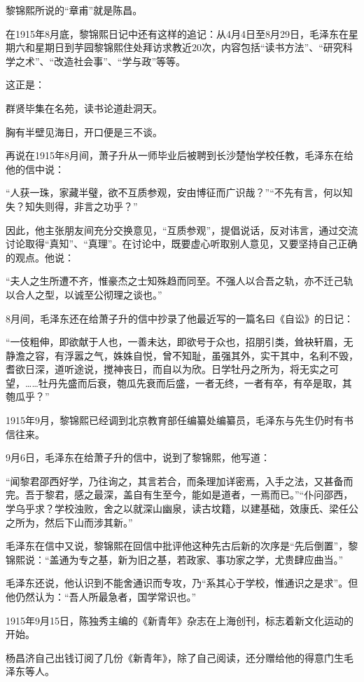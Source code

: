 \documentclass[../../dazhuan.tex]{subfiles}
\begin{document}
黎锦熙所说的“章甫”就是陈昌。

在1915年8月底，黎锦熙日记中还有这样的追记：从4月4日至8月29日，毛泽东在星期六和星期日到芋园黎锦熙住处拜访求教近20次，内容包括“读书方法”、“研究科学之术”、“改造社会事”、“学与政”等等。

这正是：\begin{xemph}群贤毕集在名苑，读书论道赴洞天。\end{xemph}


胸有半壁见海日，开口便是三不谈。

再说在1915年8月间，萧子升从一师毕业后被聘到长沙楚怡学校任教，毛泽东在给他的信中说：

“人获一珠，家藏半璧，欲不互质参观，安由博征而广识哉？”“不先有言，何以知失？知失则得，非言之功乎？”

因此，他主张朋友间充分交换意见，“互质参观”，提倡说话，反对讳言，通过交流讨论取得“真知”、“真理”。在讨论中，既要虚心听取别人意见，又要坚持自己正确的观点。他说：

“夫人之生所遭不齐，惟豪杰之士知殊趋而同至。不强人以合吾之轨，亦不迁己轨以合人之型，以诚至公彻理之谈也。”

8月间，毛泽东还在给萧子升的信中抄录了他最近写的一篇名曰《自讼》的日记：

“一伎粗伸，即欲献于人也，一善未达，即欲号于众也，招朋引类，耸袂轩眉，无静澹之容，有浮嚣之气，姝姝自悦，曾不知耻，虽强其外，实干其中，名利不毁，耆欲日深，道听途说，搅神丧日，而自以为欣。日学牡丹之所为，将无实之可望，……牡丹先盛而后衰，匏瓜先衰而后盛，一者无终，一者有卒，有卒是取，其匏瓜乎？”

1915年9月，黎锦熙已经调到北京教育部任编纂处编纂员，毛泽东与先生仍时有书信往来。

9月6日，毛泽东在给萧子升的信中，说到了黎锦熙，他写道：

“闻黎君邵西好学，乃往询之，其言若合，而条理加详密焉，入手之法，又甚备而完。吾于黎君，感之最深，盖自有生至今，能如是道者，一焉而已。”“仆问邵西，学乌乎求？学校浊败，舍之以就深山幽泉，读古坟籍，以建基础，效康氏、梁任公之所为，然后下山而涉其新。”

毛泽东在信中又说，黎锦熙在回信中批评他这种先古后新的次序是“先后倒置”，黎锦熙说：“盖通为专之基，新为旧之基，若政家、事功家之学，尤贵肆应曲当。”

毛泽东还说，他认识到不能舍通识而专攻，乃“系其心于学校，惟通识之是求”。但他仍然认为：“吾人所最急者，国学常识也。”

1915年9月15日，陈独秀主编的《新青年》杂志在上海创刊，标志着新文化运动的开始。

杨昌济自己出钱订阅了几份《新青年》，除了自己阅读，还分赠给他的得意门生毛泽东等人。
\end{document}
